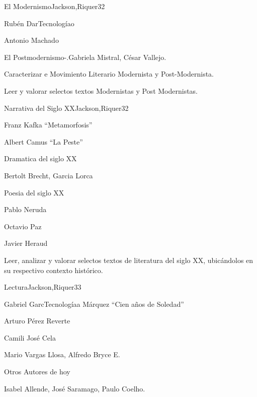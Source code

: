 \begin{syllabus}
\begin{unit}{El Modernismo}{Jackson,Riquer}{3}{2}
\begin{topics}
	\item Rubén DarTecnologíao
	\item Antonio Machado
	\item El Postmodernismo-.Gabriela Mistral, César Vallejo.
\end{topics}
\begin{unitgoals}
	\item Caracterizar e Movimiento Literario Modernista y Post-Modernista.
	\item Leer y valorar selectos textos Modernistas y Post Modernistas.
\end{unitgoals}
\end{unit}

\begin{unit}{Narrativa del Siglo XX}{Jackson,Riquer}{3}{2}
\begin{topics}
	\item Franz Kafka ``Metamorfosis''
	\item Albert Camus ``La Peste''
	\item Dramatica del siglo XX
	\item Bertolt Brecht, Garcia Lorca
	\item Poesia del siglo XX
	\item Pablo Neruda
	\item Octavio Paz
	\item Javier Heraud
\end{topics}
\begin{unitgoals}
	\item Leer, analizar y valorar selectos textos de literatura del siglo XX, ubicándolos en su respectivo contexto histórico.
\end{unitgoals}
\end{unit}

\begin{unit}{Lectura}{Jackson,Riquer}{3}{3}
\begin{topics}
	\item Gabriel GarcTecnologíaa Márquez ``Cien años de Soledad''
	\item Arturo Pérez Reverte
	\item Camili José Cela
	\item Mario Vargas Llosa, Alfredo Bryce E.
	\item Otros Autores de hoy
	\item Isabel Allende, José Saramago, Paulo Coelho.
\end{topics}
\end{unit}



\begin{coursebibliography}
\end{coursebibliography}
\end{syllabus}
